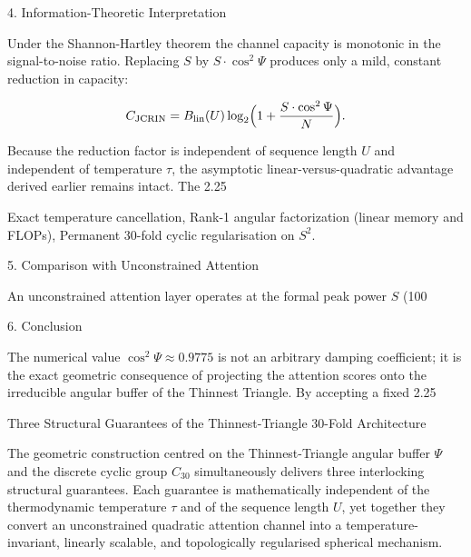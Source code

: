 4. Information-Theoretic Interpretation

Under the Shannon-Hartley theorem the channel capacity is monotonic in the signal-to-noise ratio. Replacing \(S\) by \(S\cdot\cos^2\Psi\) produces only a mild, constant reduction in capacity:

\[
C_{\rm JCRIN}=B_{\rm lin}(U)\log_2\Bigl(1+\frac{S\cdot\cos^2\Psi}{N}\Bigr).
\]

Because the reduction factor is independent of sequence length \(U\) and independent of temperature \(\tau\), the asymptotic linear-versus-quadratic advantage derived earlier remains intact. The 2.25 %

Exact temperature cancellation,
Rank-1 angular factorization (linear memory and FLOPs),
Permanent 30-fold cyclic regularisation on \(S^2\).

5. Comparison with Unconstrained Attention

An unconstrained attention layer operates at the formal peak power \(S\) (100 %

6. Conclusion

The numerical value \(\cos^2\Psi\approx0.9775\) is not an arbitrary damping coefficient; it is the exact geometric consequence of projecting the attention scores onto the irreducible angular buffer of the Thinnest Triangle. By accepting a fixed 2.25 %

Three Structural Guarantees of the Thinnest-Triangle 30-Fold Architecture

The geometric construction centred on the Thinnest-Triangle angular buffer \(\Psi\) and the discrete cyclic group \(C_{30}\) simultaneously delivers three interlocking structural guarantees. Each guarantee is mathematically independent of the thermodynamic temperature \(\tau\) and of the sequence length \(U\), yet together they convert an unconstrained quadratic attention channel into a temperature-invariant, linearly scalable, and topologically regularised spherical mechanism.

